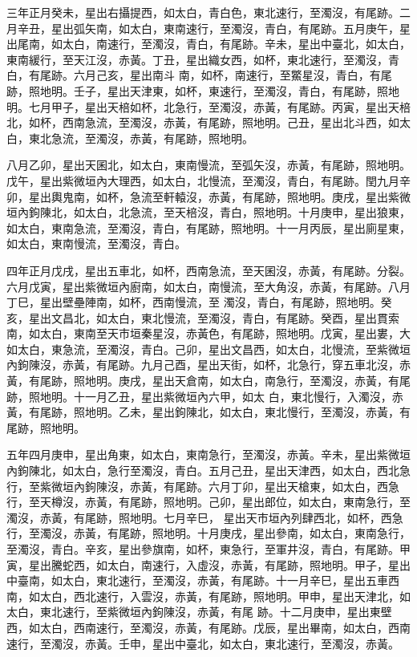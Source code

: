 \begin{pinyinscope}
 三年正月癸未，星出右攝提西，如太白，青白色，東北速行，至濁沒，有尾跡。二月辛丑，星出弧矢南，如太白，東南速行，至濁沒，青白，有尾跡。五月庚午，星出尾南，如太白，南速行，至濁沒，青白，有尾跡。辛未，星出中臺北，如太白，東南緩行，至天江沒，赤黃。丁丑，星出織女西，如杯，東北速行，至濁沒，青白，有尾跡。六月己亥，星出南斗
 南，如杯，南速行，至鱉星沒，青白，有尾跡，照地明。壬子，星出天津東，如杯，東速行，至濁沒，青白，有尾跡，照地明。七月甲子，星出天棓如杯，北急行，至濁沒，赤黃，有尾跡。丙寅，星出天棓北，如杯，西南急流，至濁沒，赤黃，有尾跡，照地明。己丑，星出北斗西，如太白，東北急流，至濁沒，赤黃，有尾跡，照地明。



 八月乙卯，星出天囷北，如太白，東南慢流，至弧矢沒，赤黃，有尾跡，照地明。戊午，星出紫微垣內大理西，如太白，北慢流，至濁沒，青白，有尾跡。閏九月辛
 卯，星出輿鬼南，如杯，急流至軒轅沒，赤黃，有尾跡，照地明。庚戌，星出紫微垣內鉤陳北，如太白，北急流，至天棓沒，青白，照地明。十月庚申，星出狼東，如太白，東南急流，至濁沒，青白，有尾跡，照地明。十一月丙辰，星出廁星東，如太白，東南慢流，至濁沒，青白。



 四年正月戊戌，星出五車北，如杯，西南急流，至天囷沒，赤黃，有尾跡。分裂。六月戊寅，星出紫微垣內廚南，如太白，南慢流，至大角沒，赤黃，有尾跡。八月丁巳，星出壁壘陣南，如杯，西南慢流，至
 濁沒，青白，有尾跡，照地明。癸亥，星出文昌北，如太白，東北慢流，至濁沒，青白，有尾跡。癸酉，星出貫索南，如太白，東南至天市垣秦星沒，赤黃色，有尾跡，照地明。戊寅，星出婁，大如太白，東急流，至濁沒，青白。己卯，星出文昌西，如太白，北慢流，至紫微垣內鉤陳沒，赤黃，有尾跡。九月己酉，星出天街，如杯，北急行，穿五車北沒，赤黃，有尾跡，照地明。庚戌，星出天倉南，如太白，南急行，至濁沒，赤黃，有尾跡，照地明。十一月乙丑，星出紫微垣內六甲，如太
 白，東北慢行，入濁沒，赤黃，有尾跡，照地明。乙未，星出鉤陳北，如太白，東北慢行，至濁沒，赤黃，有尾跡，照地明。



 五年四月庚申，星出角東，如太白，東南急行，至濁沒，赤黃。辛未，星出紫微垣內鉤陳北，如太白，急行至濁沒，青白。五月己丑，星出天津西，如太白，西北急行，至紫微垣內鉤陳沒，赤黃，有尾跡。六月丁卯，星出天槍東，如太白，西急行，至天樽沒，赤黃，有尾跡，照地明。己卯，星出郎位，如太白，東南急行，至濁沒，赤黃，有尾跡，照地明。七月辛巳，
 星出天市垣內列肆西北，如杯，西急行，至濁沒，赤黃，有尾跡，照地明。十月庚戌，星出參南，如太白，東南急行，至濁沒，青白。辛亥，星出參旗南，如杯，東急行，至軍井沒，青白，有尾跡。甲寅，星出騰蛇西，如太白，南速行，入虛沒，赤黃，有尾跡，照地明。甲子，星出中臺南，如太白，東北速行，至濁沒，赤黃，有尾跡。十一月辛巳，星出五車西南，如太白，西北速行，入雲沒，赤黃，有尾跡，照地明。甲申，星出天津北，如太白，東北速行，至紫微垣內鉤陳沒，赤黃，有尾
 跡。十二月庚申，星出東壁西，如太白，西南速行，至濁沒，赤黃，有尾跡。戊辰，星出畢南，如太白，西南速行，至濁沒，赤黃。壬申，星出中臺北，如太白，東北速行，至濁沒，赤黃。




\end{pinyinscope}

